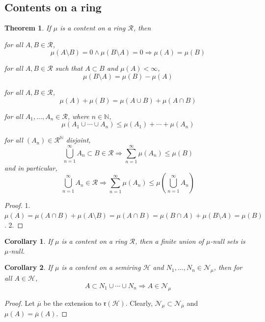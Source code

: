 \documentclass[11pt, a4paper, openany]{book}
\newtheorem{thm}{Theorem}\newtheorem{lem}{Lemma}\newtheorem{crl}{Corollary}
\theoremstyle{definition}
\newenvironment{tight_enumerate}{\begin{enumerate}\itemsep -0.2em}{\end{enumerate}}
\begin{document}
\subsection{Contents on a ring}
    \begin{thm}\label{properties of contents}
        If $\mu$ is a content on a ring $\mathscr{R}$, then
        \begin{tight_enumerate}
            \item for all $A,B\in\mathscr{R}$,
            \[
                \mu(A\setminus B)=0\wedge \mu(B\setminus A)=0 \Longrightarrow \mu(A)=\mu(B)
            \]
            \item for all $A,B\in\mathscr{R}$ such that $A\subset B$ and $\mu(A)<\infty$,
            \[\mu(B\setminus A)=\mu(B)-\mu(A)\]
            \item for all $A,B\in\mathscr{R}$,
            \[\mu(A)+\mu(B)=\mu(A\cup B)+\mu(A\cap B)\]
            \item \label{subadditivity of contents on a ring} for all $A_1,\dots,A_n\in\mathscr{R}$, where $n\in\mathbb{N}$,
            \[\mu(A_1\cup \cdots\cup A_n)\leqslant \mu(A_1)+\cdots+\mu(A_n)\]
            \item for all $(A_n)\in\mathscr{R}^\mathbb{N}$ disjoint,
            \[
                \bigcup_{n=1}^\infty A_n\subset B\in\mathscr{R}\Longrightarrow \sum_{n=1}^\infty \mu(A_n)\leqslant \mu(B)
            \]
            and in particular,
            \[
                \bigcup_{n=1}^\infty A_n\in\mathscr{R}\Longrightarrow \sum_{n=1}^\infty \mu(A_n)\leqslant \mu\left(\bigcup_{n=1}^\infty A_n\right)
            \]
        \end{tight_enumerate}
    \end{thm}
    \begin{proof}
        1. $\mu(A)=\mu(A\cap B)+\mu(A\setminus B)=\mu(A\cap B)=\mu(B\cap A)+\mu(B\setminus A)=\mu(B)$. 2.
    \end{proof}
    \begin{crl}
        If $\mu$ is a content on a ring $\mathscr{R}$, then a finite union of $\mu$-null sets is $\mu$-null.
    \end{crl}
    \begin{crl}\label{subsets of a finite union of null sets of a content}
        If $\mu$ is a content on a semiring $\mathscr{H}$ and $N_1,\dots,N_n\in\mathscr{N}_\mu$, then for all $A\in\mathscr{H}$,
        \[
            A\subset N_1\cup\cdots\cup N_n\Longrightarrow A\in\mathscr{N}_\mu
        \]
    \end{crl}
    \begin{proof}
        Let $\overline{\mu}$ be the extension to $\mathfrak{r}(\mathscr{H})$. Clearly, $\mathscr{N}_\mu\subset \mathscr{N}_{\overline{\mu}}$ and $\mu(A)=\overline{\mu}(A)$.
    \end{proof}
\end{document}
